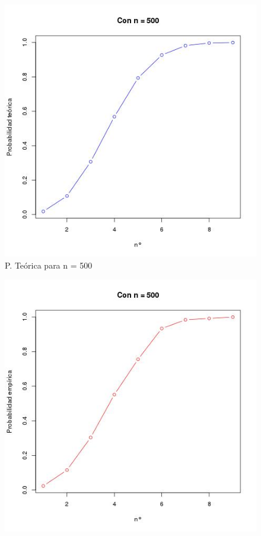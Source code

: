 \documentclass[letter,10pt]{article}
\begin{document}
\begin{itemize}
  \begin{minipage}{\linewidth}
      \centering
      \begin{minipage}{0.45\linewidth}
          \begin{figure}[H]
              \includegraphics[width=\linewidth]{p4_teo_500.jpg}
              \caption{P. Te\'orica para n = 500}
          \end{figure}
      \end{minipage}
      \hspace{0.05\linewidth}
      \begin{minipage}{0.45\linewidth}
          \begin{figure}[H]
              \includegraphics[width=\linewidth]{p4_emp_500.jpg}

\end{figure}
\end{minipage}
\end{minipage}
\end{itemize}
\end{document}
